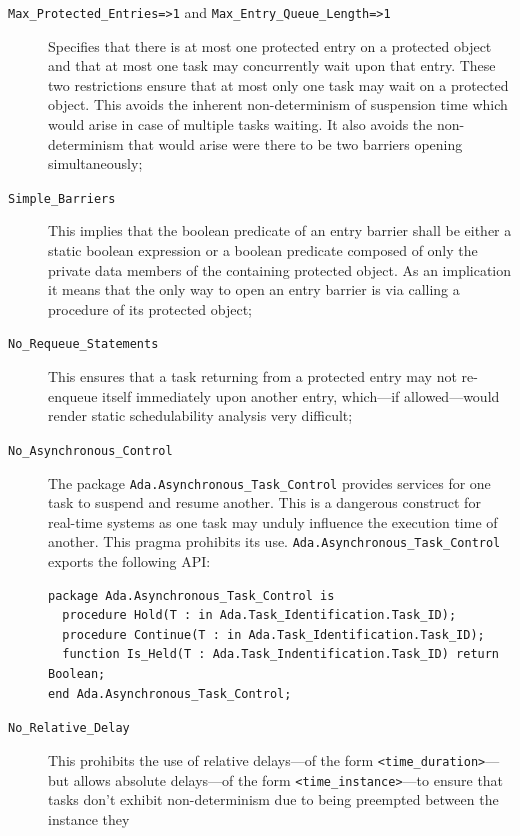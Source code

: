 \begin{description}
\item[\texttt{Max\_Protected\_Entries=>1} and
  \texttt{Max\_Entry\_Queue\_Length=>1}]{Specifies that there is at
  most one protected entry on a protected object and that at most one
  task may concurrently wait upon that entry. These two restrictions
  ensure that at most only one task may wait on a protected
  object. This avoids the inherent non-determinism of suspension time
  which would arise in case of multiple tasks waiting. It also avoids
  the non-determinism that would arise were there to be two barriers
  opening simultaneously;}
\item[\texttt{Simple\_Barriers}]{This implies that the boolean
  predicate of an entry barrier shall be either a static boolean
  expression or a boolean predicate composed of only the private data
  members of the containing protected object. As an implication it
  means that the only way to open an entry barrier is via calling a
  procedure of its protected object;}
\item[\texttt{No\_Requeue\_Statements}]{This ensures that a task
  returning from a protected entry may not re-enqueue itself
  immediately upon another entry, which---if allowed---would render
  static schedulability analysis very difficult;}
\item[\texttt{No\_Asynchronous\_Control}]{The package
  \texttt{Ada.Asynchronous\_Task\_Control} provides services for one
  task to suspend and resume another. This is a dangerous construct
  for real-time systems as one task may unduly influence the execution
  time of another. This pragma prohibits its
  use. \texttt{Ada.Asynchronous\_Task\_Control} exports the following
  API:
\begin{lstlisting}[label=ada.asynchronous_task_control, caption=The
    \texttt{Ada.Asynchronous\_Task\_Control} package specification]
package Ada.Asynchronous_Task_Control is
  procedure Hold(T : in Ada.Task_Identification.Task_ID);
  procedure Continue(T : in Ada.Task_Identification.Task_ID);
  function Is_Held(T : Ada.Task_Indentification.Task_ID) return Boolean;
end Ada.Asynchronous_Task_Control;
\end{lstlisting}}
\item[\texttt{No\_Relative\_Delay}]{This prohibits the use of relative
  delays---of the form  \texttt{<time\_duration>}---but
  allows absolute delays---of the form 
  \texttt{<time\_instance>}---to ensure that tasks don't exhibit
  non-determinism due to being preempted between the instance they
}
\end{description}

